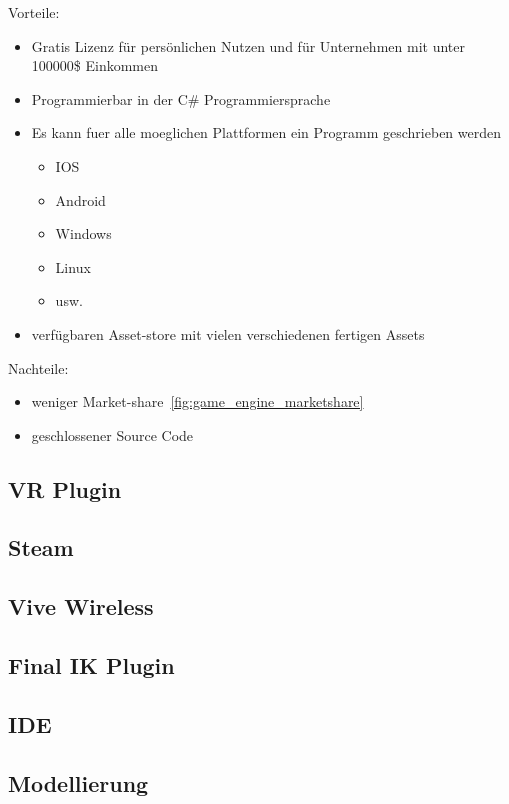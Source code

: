 Vorteile:

\begin{itemize}
    \item Gratis Lizenz für persönlichen Nutzen und für Unternehmen mit unter 100000\$ Einkommen
    \item Programmierbar in der C# Programmiersprache
    \item Es kann fuer alle moeglichen Plattformen ein Programm geschrieben werden
    \begin{itemize}
        \item IOS
        \item Android
        \item Windows
        \item Linux
        \item usw.
    \end{itemize}
    \item verfügbaren Asset-store mit vielen verschiedenen fertigen Assets
\end{itemize}

Nachteile:

\begin{itemize}
    \item weniger Market-share~\ref{fig:game_engine_marketshare}
    \item geschlossener Source Code
\end{itemize}

\subsection{VR Plugin}
\lipsum[5-12]

\subsection{Steam}
\lipsum[5-12]

\subsection{Vive Wireless}
\lipsum[5-12]

\subsection{Final IK Plugin}
\lipsum[5-12]

\subsection{IDE}
\lipsum[5-12]

\subsection{Modellierung}
\lipsum[5-12]
